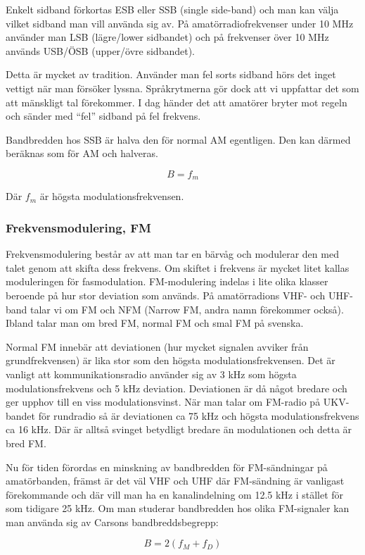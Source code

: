 Enkelt sidband förkortas ESB eller SSB (single side-band) och man kan välja vilket sidband man vill använda sig av. På amatörradiofrekvenser under 10 MHz använder man LSB (lägre/lower sidbandet) och på frekvenser över 10 MHz används USB/ÖSB (upper/övre sidbandet). 

Detta är mycket av tradition. Använder man fel sorts sidband hörs det inget vettigt när man försöker lyssna. Språkrytmerna gör dock att vi uppfattar det som att mänskligt tal förekommer. I dag händer det att amatörer bryter mot regeln och sänder med ``fel'' sidband på fel frekvens.

Bandbredden hos SSB är halva den för normal AM egentligen. Den kan därmed beräknas som för AM och halveras.

$$B=f_m$$

Där $f_m$ är högsta modulationsfrekvensen.

\subsubsection{Frekvensmodulering, FM}

Frekvensmodulering består av att man tar en bärvåg och modulerar den med talet genom att skifta dess frekvens. Om skiftet i frekvens är mycket litet kallas moduleringen för fasmodulation. FM-modulering indelas i lite olika klasser beroende på hur stor deviation som används. På amatörradions VHF- och UHF-band talar vi om FM och NFM (Narrow FM, andra namn förekommer också). Ibland talar man om bred FM, normal FM och smal FM på svenska.

Normal FM innebär att deviationen (hur mycket signalen avviker från grundfrekvensen) är lika stor som den högsta modulationsfrekvensen. Det är vanligt att kommunikationsradio använder sig av 3 kHz som högsta modulationsfrekvens och 5 kHz deviation. Deviationen är då något bredare och ger upphov till en viss modulationsvinst. När man talar om FM-radio på UKV-bandet för rundradio så är deviationen ca 75 kHz och högsta modulationsfrekvens ca 16 kHz. Där är alltså svinget betydligt bredare än modulationen och detta är bred FM.

Nu för tiden förordas en minskning av bandbredden för FM-sändningar på amatörbanden, främst är det väl VHF och UHF där FM-sändning är vanligast förekommande och där vill man ha en kanalindelning om 12.5 kHz i stället för som tidigare 25 kHz. Om man studerar bandbredden hos olika FM-signaler kan man använda sig av Carsons bandbreddsbegrepp:

$$B=2(f_M+f_D)$$


